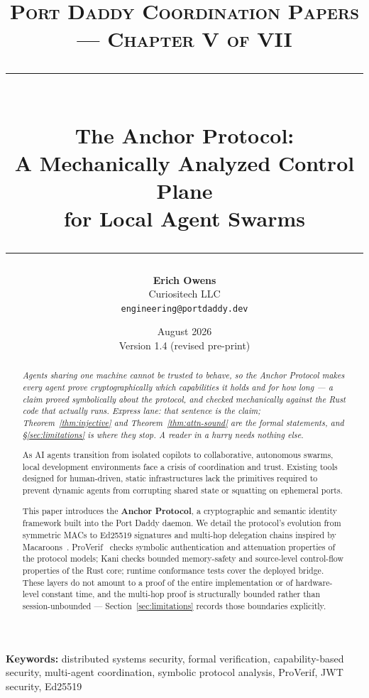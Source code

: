\documentclass[11pt,a4paper]{article}
\title{
  \vspace{-1cm}
  {\Large\textsc{Port Daddy Coordination Papers --- Chapter V of VII}}\\[0.5cm]
  \rule{\textwidth}{0.5pt}\\[0.3cm]
  {\LARGE\textbf{The Anchor Protocol:}}\\[0.2cm]
  {\Large A Mechanically Analyzed Control Plane\\for Local Agent Swarms}\\[0.3cm]
  \rule{\textwidth}{0.5pt}
}
\author{
  \textbf{Erich Owens}\\[0.2cm]
  Curiositech LLC\\[0.2cm]
  \texttt{engineering@portdaddy.dev}
}
\date{August 2026\\Version 1.4 (revised pre-print)}
\theoremstyle{definition}
\begin{document}
\setlength{\emergencystretch}{2em}

\maketitle
\thispagestyle{empty}

\vspace{1cm}

\begin{abstract}\noindent
\emph{Agents sharing one machine cannot be trusted to behave, so the Anchor Protocol makes every agent prove cryptographically which capabilities it holds and for how long --- a claim proved symbolically about the protocol, and checked mechanically against the Rust code that actually runs. Express lane: that sentence is the claim; Theorem~\ref{thm:injective} and Theorem~\ref{thm:attn-sound} are the formal statements, and \S\ref{sec:limitations} is where they stop. A reader in a hurry needs nothing else.}

\medskip\noindent
As AI agents transition from isolated copilots to collaborative, autonomous swarms, local development environments face a crisis of coordination and trust. Existing tools designed for human-driven, static infrastructures lack the primitives required to prevent dynamic agents from corrupting shared state or squatting on ephemeral ports.

This paper introduces the \textbf{Anchor Protocol}, a cryptographic and semantic identity framework built into the Port Daddy daemon. We detail the protocol's evolution from symmetric MACs to Ed25519 signatures and multi-hop delegation chains inspired by Macaroons~\cite{birgisson2014macaroons}. ProVerif~\cite{blanchet2016modeling} checks symbolic authentication and attenuation properties of the protocol models; Kani checks bounded memory-safety and source-level control-flow properties of the Rust core; runtime conformance tests cover the deployed bridge. These layers do not amount to a proof of the entire implementation or of hardware-level constant time, and the multi-hop proof is structurally bounded rather than session-unbounded --- Section~\ref{sec:limitations} records those boundaries explicitly.
\end{abstract}

\vspace{0.5cm}
\noindent\textbf{Keywords:} distributed systems security, formal verification, capability-based security, multi-agent coordination, symbolic protocol analysis, ProVerif, JWT security, Ed25519
\end{document}
